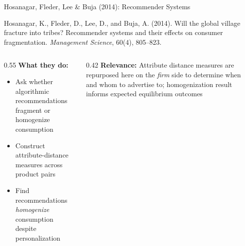 \documentclass[aspectratio=169,professionalfonts]{beamer}
\newcommand{\hl}[1]{\textbf{\textcolor{UGARed}{#1}}}
\begin{document}
\begin{frame}{Hosanagar, Fleder, Lee \& Buja (2014): Recommender Systems}
  \begin{tcolorbox}[colback=red!5!white, colframe=UGARed, title=\textbf{Citation}]
    Hosanagar, K., Fleder, D., Lee, D., and Buja, A. (2014). Will the global village
    fracture into tribes? Recommender systems and their effects on consumer fragmentation.
    \textit{Management Science}, 60(4), 805--823.
  \end{tcolorbox}
  \vspace{6pt}
  \begin{columns}[T]
    \begin{column}{0.55\textwidth}
      \hl{What they do:}
      \begin{itemize}
        \item Ask whether algorithmic recommendations fragment or homogenize consumption
        \item Construct attribute-distance measures across product pairs
        \item Find recommendations \emph{homogenize} consumption despite personalization
      \end{itemize}
    \end{column}
    \begin{column}{0.42\textwidth}
      \hl{Relevance:} Attribute distance measures are repurposed here on the \emph{firm}
      side to determine when and whom to advertise to; homogenization result informs
      expected equilibrium outcomes
    \end{column}
  \end{columns}
\end{frame}
\end{document}
